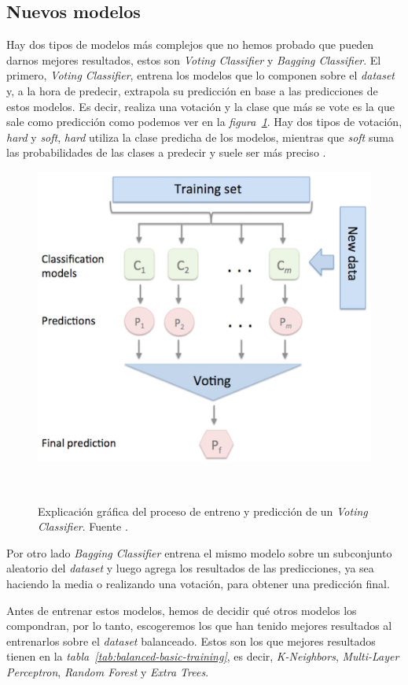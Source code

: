 \clearpage
\subsection{Nuevos modelos}

Hay dos tipos de modelos más complejos que no hemos probado que pueden darnos mejores resultados, estos son \textit{Voting Classifier} y \textit{Bagging Classifier}. El primero, \textit{Voting Classifier}, entrena los modelos que lo componen sobre el \textit{dataset} y, a la hora de predecir, extrapola su predicción en base a las predicciones de estos modelos. Es decir, realiza una votación y la clase que más se vote es la que sale como predicción como podemos ver en la \textit{figura\ \ref{fig:voting-classifiers}}. Hay dos tipos de votación, \textit{hard} y \textit{soft}, \textit{hard} utiliza la clase predicha de los modelos, mientras que \textit{soft} suma las probabilidades de las clases a predecir y suele ser más preciso \cite{Ensemble96:online}. 

\begin{figure}[!h]
    \centering
    \includegraphics[width=0.7\linewidth]{media/images/majority_voting.png}
    \caption{Explicación gráfica del proceso de entreno y predicción de un \textit{Voting Classifier}. Fuente \cite{Ensemble96:online}.}\ \label{fig:voting-classifiers}
\end{figure}

Por otro lado \textit{Bagging Classifier} entrena el mismo modelo sobre un subconjunto aleatorio del \textit{dataset} y luego agrega los resultados de las predicciones, ya sea haciendo la media o realizando una votación, para obtener una predicción final.\ \cite{sklearne53:online}


Antes de entrenar estos modelos, hemos de decidir qué otros modelos los compondran, por lo tanto, escogeremos los que han tenido mejores resultados al entrenarlos sobre el \textit{dataset} balanceado. Estos son los que mejores resultados tienen en la \textit{tabla\ \ref{tab:balanced-basic-training}}, es decir, \textit{K-Neighbors}, \textit{Multi-Layer Perceptron}, \textit{Random Forest} y \textit{Extra Trees}.

